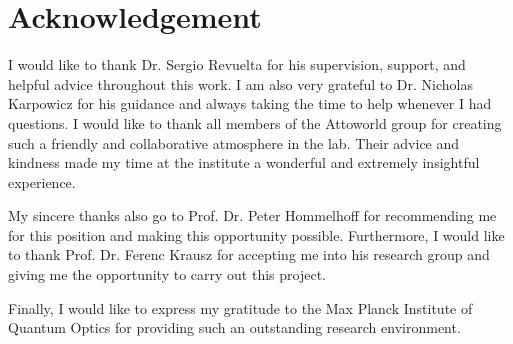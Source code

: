 \chapter*{Acknowledgement}
\thispagestyle{empty}
I would like to thank Dr. Sergio Revuelta for his supervision, support, and helpful advice throughout this work. I am also very grateful to Dr. Nicholas Karpowicz for his guidance and always taking the time to help whenever I had questions. I would like to thank all members of the Attoworld group for creating such a friendly and collaborative atmosphere in the lab. Their advice and kindness made my time at the institute a wonderful and extremely insightful experience.

My sincere thanks also go to Prof. Dr. Peter Hommelhoff for recommending me for this position and making this opportunity possible. Furthermore, I would like to thank Prof. Dr. Ferenc Krausz for accepting me into his research group and giving me the opportunity to carry out this project.

Finally, I would like to express my gratitude to the Max Planck Institute of Quantum Optics for providing such an outstanding research environment.